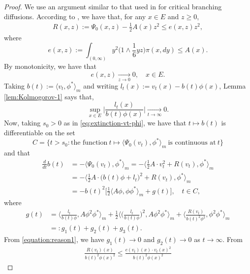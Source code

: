 \begin{proof}
	We use an argument similar to that used in \cite{Powell2015An-invariance} for critical branching diffusions.
	According to \cite{RenSongZhang2015Limit}, we have that, for any $x\in E$ and $z\geq 0$,
\[\begin{split}
	R(x,z)
	:=\Psi_0(x,z)-\frac{1}{2} A(x)z^2
	\leq e(x,z)z^2,
\end{split}\]
	where
\[
	e(x,z)
	:=\int_{(0,\infty)}y^2\big(1\wedge \frac{1}{6}yz\big)\pi(x,dy)
	\leq  A(x).	
\]
	By monotonicity, we have that
\begin{equation}\label{equation:reason2}
	e(x,z)
	\xrightarrow[z\to 0]{} 0,
	\quad x\in E.
\end{equation}
	Taking $b(t):=\langle v_t,\phi^*\rangle_m$ and writing $l_t(x):=v_t(x)-b(t)\phi(x)$, Lemma \ref{lem:Kolmogorov-1} says that,
\begin{equation}\label{equation:reason1}
	\sup_{x\in E}\Big|\frac{l_t(x)}{b(t)\phi(x)}\Big|
	\xrightarrow[t\to\infty]{} 0.
\end{equation}
	Now, taking $s_0>0$ as in \eqref{eq:extinction-vt-phi},
	we have that $t\mapsto b(t)$ is differentiable on the set
\[
	C
	=\{t> s_0: \text{the function}~ t \mapsto \langle\Psi_0(v_t),\phi^*\rangle_m~ \text{is continuous at}~ t \}
\]
	and that
\begin{equation}\label{equation:b(t)}\begin{split}
	\frac{d}{dt}b(t)
	&= -\langle\Psi_0(v_t),\phi^*\rangle_m
	= -\big\langle \frac{1}{2} A \cdot v_t^2+R (v_t),\phi^*\big\rangle_m \\
	&= -\big\langle \frac{1}{2}  A \cdot \big(b(t)\phi+l_t\big)^2+R (v_t),\phi^*\big\rangle_m\\
	&= -b(t)^2\big[\frac{1}{2} \langle  A\phi,\phi \phi^*\rangle_m+g(t)\big],
	\quad t\in C,
\end{split}\end{equation}	
	where
\[\begin{split}
	g(t)
	&= \Big\langle \frac{l_t}{b(t) \phi}, A\phi^2\phi^*\Big\rangle_m + \frac{1}{2}\Big\langle \Big(\frac{l_t}{b(t) \phi}\Big)^2, A\phi^2\phi^*\Big\rangle_m + \Big\langle \frac{R(v_t)}{b(t)^2 \phi^2},\phi^2\phi^*\Big\rangle_m \\
	&=: g_1(t) + g_2(t) + g_3(t).
\end{split}\]
	From \eqref{equation:reason1}, we have $g_1(t)\to 0$ and $g_2(t)\to 0$ as $t\to\infty$.
	From
\[\begin{split}
	\frac{R(v_t)(x)}{b(t)^2 \phi(x)^2}
	\leq \frac{e(v_t)(x)\cdot v_t(x)^2}{ b(t)^2\phi(x)^2}

\end{split}\]
\end{proof}
